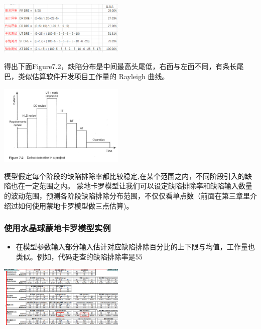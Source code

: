 \includegraphics[width=6cm]{1113corrDreScreenshot_2021-11-13_212509.png}

得出下面Figure7.2，缺陷分布是中间最高头尾低，右面与左面不同，有条长尾巴，类似估算软件开发项目工作量的
Rayleigh 曲线。

\includegraphics[width=6cm]{jalote_emm_72.png}

模型假定每个阶段的缺陷排除率都比较稳定,在某个范围之内，不同阶段引入的缺陷也在一定范围之内。
蒙地卡罗模型让我们可以设定缺陷排除率和缺陷输入数量的波动范围，预测各阶段缺陷排除分布范围，不仅仅看单点数（前面在第三章里介绍过如何使用蒙地卡罗模型做三点估算)。

\hypertarget{ux57f9ux8badux5bf9ux8c61}{%
\subsubsection{使用水晶球蒙地卡罗模型实例}\label{ux57f9ux8badux5bf9ux8c61}}

\begin{itemize}
\tightlist
\item
  在模型参数输入部分输入估计对应缺陷排除百分比的上下限与均值，工作量也类似。例如，代码走查的缺陷排除率是55%

\end{itemize}

\includegraphics[width=6cm]{微信截图_20211027011246.png}

